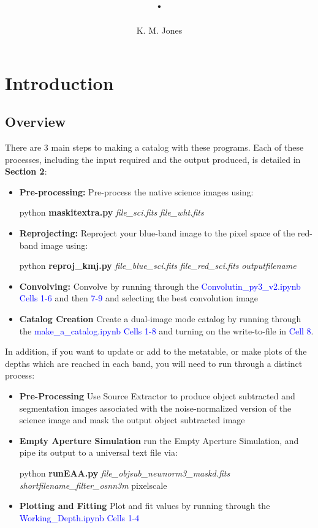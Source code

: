 \documentclass[a4paper,10pt]{article}
\title{.}
\author{K. M. Jones}
\begin{document}
\maketitle
\tableofcontents

\section{Introduction}
\subsection*{Overview}
There are 3 main steps to making a catalog with these programs. Each of these processes, including the input required and the output produced, is detailed in \textbf{Section 2}:
\begin{itemize}
 \item{\textbf{Pre-processing:}} 
 Pre-process the native science images using:\\
 
 \centerline{python \textbf{maskitextra.py} \textit{file\_sci.fits} \textit{file\_wht.fits}}
 
 \item{\textbf{Reprojecting:}} Reproject your blue-band image to the pixel space of the red-band image using: \\
 
 \centerline{python \textbf{reproj\_kmj.py} \textit{file\_blue\_sci.fits} \textit{file\_red\_sci.fits} \textit{outputfilename}}
 
 \item{\textbf{Convolving:}} Convolve by running through the \textcolor{blue}{Convolutin\_py3\_v2.ipynb Cells 1-6} and then \textcolor{blue}{7-9} and selecting the best convolution image
 \item{\textbf{Catalog Creation}} Create a dual-image mode catalog by running through the \textcolor{blue}{make\_a\_catalog.ipynb Cells 1-8} and turning on the write-to-file in \textcolor{blue}{Cell 8}.
\end{itemize}

In addition, if you want to update or add to the metatable, or make plots of the depths which are reached in each band, you will need to run through a distinct process:
\begin{itemize}
 \item{\textbf{Pre-Processing}} Use Source Extractor to produce object subtracted and segmentation images associated with the noise-normalized version of the science image and mask the output object subtracted image
 \item{\textbf{Empty Aperture Simulation}} run the Empty Aperture Simulation, and pipe its output to a universal text file via: \\
 
 \centerline{python \textbf{runEAA.py} \textit{file\_objsub\_newnorm3\_maskd.fits} \textit{shortfilename\_filter\_osnn3m} pixelscale} 
 
 
 \item{\textbf{Plotting and Fitting}} Plot and fit values by running through the \textcolor{blue}{Working\_Depth.ipynb Cells 1-4}
\end{itemize}
\end{document}
